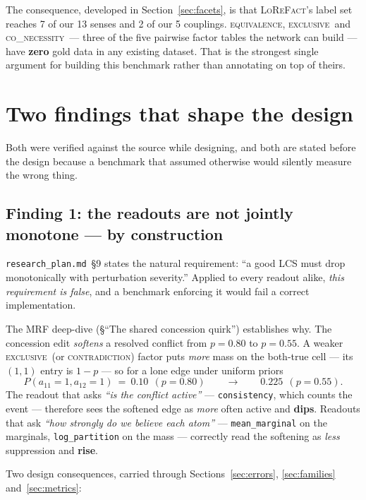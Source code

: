 \documentclass[11pt]{article}
\newcommand{\cCon}{\textsc{contradiction}}
\newcommand{\cEqv}{\textsc{equivalence}}
\newcommand{\cExc}{\textsc{exclusive}}
\newcommand{\cCoN}{\textsc{co\_necessity}}
\newcommand{\readout}[1]{\texttt{#1}}
\begin{document}
The consequence, developed in Section~\ref{sec:facets}, is that \textsc{LoReFact}'s label
set reaches 7 of our 13 senses and 2 of our 5 couplings. \cEqv, \cExc\ and \cCoN\ --- three of
the five pairwise factor tables the network can build --- have \textbf{zero} gold data in any
existing dataset. That is the strongest single argument for building this benchmark rather
than annotating on top of theirs.

\section{Two findings that shape the design}
\label{sec:findings}

Both were verified against the source while designing, and both are stated before the design
because a benchmark that assumed otherwise would silently measure the wrong thing.

\subsection{Finding 1: the readouts are not jointly monotone --- by construction}
\label{sec:finding-monotone}

\texttt{research\_plan.md}~\S9 states the natural requirement: ``a good LCS must drop
monotonically with perturbation severity.'' Applied to every readout alike, \emph{this
requirement is false}, and a benchmark enforcing it would fail a correct implementation.

The MRF deep-dive (\S``The shared concession quirk'') establishes why. The concession edit
\emph{softens} a resolved conflict from $p=0.80$ to $p=0.55$. A weaker \cExc\ (or \cCon)
factor puts \emph{more} mass on the both-true cell --- its $(1,1)$ entry is $1-p$ --- so for a
lone edge under uniform priors
\[
  P(a_{11}{=}1, a_{12}{=}1)\ =\ 0.10\ \ (p{=}0.80)
  \qquad\longrightarrow\qquad
  0.225\ \ (p{=}0.55).
\]
The readout that asks \emph{``is the conflict active''} --- \readout{consistency}, which counts
the event --- therefore sees the softened edge as \emph{more} often active and \textbf{dips}.
Readouts that ask \emph{``how strongly do we believe each atom''} ---
\readout{mean\_marginal} on the marginals, \readout{log\_partition} on the mass --- correctly
read the softening as \emph{less} suppression and \textbf{rise}.

Two design consequences, carried through Sections~\ref{sec:errors}, \ref{sec:families}
and~\ref{sec:metrics}:
\end{document}
